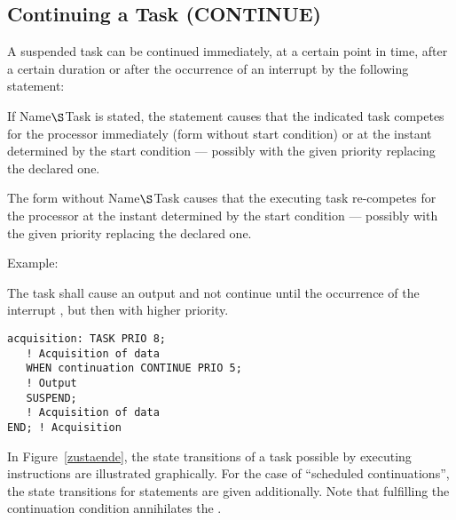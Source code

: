 \subsection{Continuing a Task (CONTINUE)}    %
\label{sec_continue}

A suspended task can be continued immediately, at a certain point in
time, after a certain duration or after the occurrence of an interrupt by
the following statement:

\begin{grammarframe}



\end{grammarframe}


If Name$\S $Task is stated, the statement causes that the indicated task
competes for the processor immediately (form without start condition) or
at the instant determined by the start condition --- possibly with the
given priority replacing the declared one.

The form without Name$\S $Task causes that the executing task re-competes
for the processor at the instant determined by the start condition ---
possibly with the given priority replacing the declared one.

Example:

The task  shall cause an output and not continue until
the occurrence of the interrupt , but then with higher
priority.

\begin{lstlisting}
acquisition: TASK PRIO 8;
   ! Acquisition of data
   WHEN continuation CONTINUE PRIO 5;
   ! Output
   SUSPEND;
   ! Acquisition of data
END; ! Acquisition
\end{lstlisting}

In Figure~\ref{zustaende},
the state transitions of a task possible by executing 
instructions are illustrated graphically. For the case of
``scheduled continuations'', the state transitions for 
 statements are
given additionally.
Note that fulfilling the continuation condition annihilates the
.


